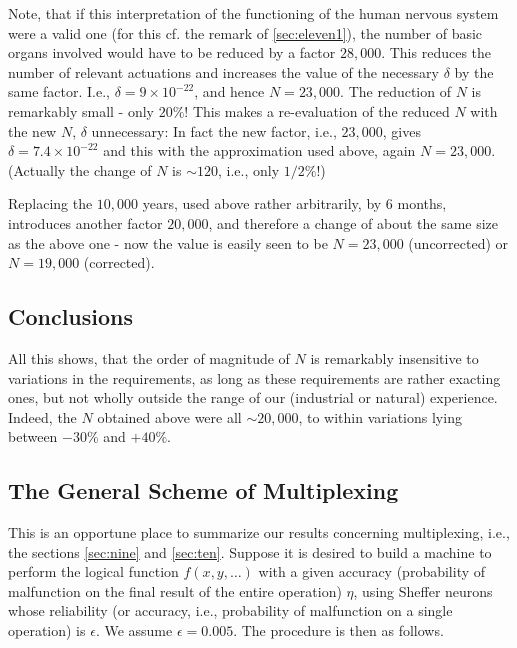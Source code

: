 \documentclass[twocolumn,preprintnumbers,amsmath,amssymb,floatfix]{revtex4}
\begin{document}
Note, that if this interpretation of the functioning of the human
nervous system were a valid one (for this cf. the remark of
\ref{sec:eleven1}), the number of basic organs involved would have
to be reduced by a factor $28,000$. This reduces the number of
relevant actuations and increases the value of the necessary
$\delta$ by the same factor. I.e., $\delta=9\times10^{-22}$, and
hence $N=23,000$. The reduction of $N$ is remarkably small - only
$20\%$! This makes a re-evaluation of the reduced $N$ with the new
$N$, $\delta$ unnecessary: In fact the new factor, i.e., $23,000$,
gives $\delta=7.4\times10^{-22}$ and this with the approximation
used above, again $N=23,000$. (Actually the change of $N$ is $\sim
120$, i.e., only $1/2\%$!)

Replacing the $10,000$ years, used above rather arbitrarily, by 6
months, introduces another factor $20,000$, and therefore a change
of about the same size as the above one - now the value is easily
seen to be $N=23,000$ (uncorrected) or $N=19,000$ (corrected).

\subsection{\label{sec:ten6}Conclusions}

All this shows, that the order of magnitude of $N$ is remarkably
insensitive to variations in the requirements, as long as these
requirements are rather exacting ones, but not wholly outside the
range of our (industrial or natural) experience. Indeed, the $N$
obtained above were all $\sim20,000$, to within variations lying
between $-30\%$ and $+40\%$.

\subsection{\label{sec:ten7}The General Scheme of Multiplexing}

This is an opportune place to summarize our results concerning
multiplexing, i.e., the sections \ref{sec:nine} and \ref{sec:ten}.
Suppose it is desired to build a machine to perform the logical
function $f(x, y, \ldots)$ with a given accuracy (probability of
malfunction on the final result of the entire operation) $\eta$,
using Sheffer neurons whose reliability (or accuracy, i.e.,
probability of malfunction on a single operation) is $\epsilon$.
We assume $\epsilon=0.005$. The procedure is then as follows.
\end{document}
